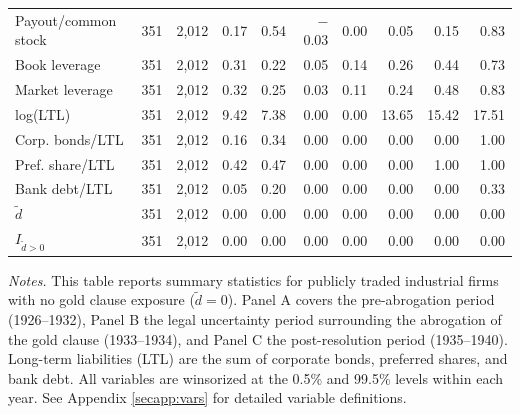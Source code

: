 \begin{table}[p]
\begin{threeparttable}
\begin{tabular}{lrrrrrrrrr}
            Payout/common stock & 351 & 2,012 & 0.17 & 0.54 & $-$0.03 & 0.00 & 0.05 & 0.15 & 0.83 \\
            Book leverage & 351 & 2,012 & 0.31 & 0.22 & 0.05 & 0.14 & 0.26 & 0.44 & 0.73 \\
            Market leverage & 351 & 2,012 & 0.32 & 0.25 & 0.03 & 0.11 & 0.24 & 0.48 & 0.83 \\
            log(LTL) & 351 & 2,012 & 9.42 & 7.38 & 0.00 & 0.00 & 13.65 & 15.42 & 17.51 \\
            Corp. bonds/LTL & 351 & 2,012 & 0.16 & 0.34 & 0.00 & 0.00 & 0.00 & 0.00 & 1.00 \\
            Pref. share/LTL & 351 & 2,012 & 0.42 & 0.47 & 0.00 & 0.00 & 0.00 & 1.00 & 1.00 \\
            Bank debt/LTL & 351 & 2,012 & 0.05 & 0.20 & 0.00 & 0.00 & 0.00 & 0.00 & 0.33 \\
            \ensuremath{\tilde{d}} & 351 & 2,012 & 0.00 & 0.00 & 0.00 & 0.00 & 0.00 & 0.00 & 0.00 \\
            \ensuremath{I_{\tilde{d}>0}} & 351 & 2,012 & 0.00 & 0.00 & 0.00 & 0.00 & 0.00 & 0.00 & 0.00 \\
            \bottomrule
        \end{tabular}
    \end{threeparttable}

    \vspace*{3mm} \justifying \noindent
\scriptsize{\textit{Notes.} This table reports summary statistics for publicly traded industrial firms with no gold clause exposure ($\tilde{d} = 0$). Panel A covers the pre-abrogation period (1926--1932), Panel B the legal uncertainty period surrounding the abrogation of the gold clause (1933--1934), and Panel C the post-resolution period (1935--1940). Long-term liabilities (LTL) are the sum of corporate bonds, preferred shares, and bank debt. All variables are winsorized at the 0.5\% and 99.5\% levels within each year. See Appendix \ref{secapp:vars} for detailed variable definitions.}
\end{table}